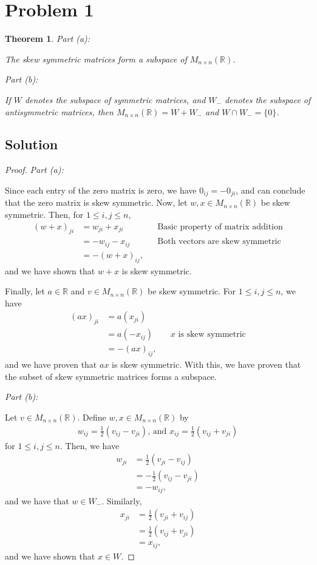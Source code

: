 \documentclass[10pt,a4paper]{article}
\author{Jeremiah Givens}
\makeatletter
\newtheorem{theorem}{Theorem}
\newcommand{\proofpart}[2]{%
  \par
  \addvspace{\medskipamount}%
  \noindent\emph{Part #1: #2}\par\nobreak
  \addvspace{\smallskipamount}%
  \@afterheading
}
\theoremstyle{definition}
\makeatother
\begin{document}
\section*{Problem 1}
\begin{theorem}
\proofpart{(a)}{} The skew symmetric matrices form a subspace of $M_{n \times n} (\mathbb{R})$.
\proofpart{(b)}{} If $W$ denotes the subspace of symmetric matrices, and $W_-$ denotes the subspace of antisymmetric matrices, then $M_{n \times n} (\mathbb{R}) = W + W_-$ and $W \cap W_- = \{0\}$.
\end{theorem}

\subsection*{Solution}
\begin{proof}
\proofpart{(a)}{} Since each entry of the zero matrix is zero, we have $0_{ij} = -0_{ji}$, and can conclude that the zero matrix is skew symmetric. Now, let $w, x \in M_{n \times n} (\mathbb{R})$ be skew symmetric. Then, for $1 \leq i,j \leq n$,
\begin{align*}
(w + x)_{ji} &= w_{ji} + x_{ji} &&\text{Basic property of matrix addition}\\
&= -w_{ij} - x_{ij} &&\text{Both vectors are skew symmetric}\\
&= -(w + x)_{ij},
\end{align*}
and we have shown that $w + x$ is skew symmetric.

Finally, let $a \in \mathbb{R}$ and $v \in M_{n \times n} (\mathbb{R})$ be skew symmetric. For $1 \leq i,j \leq n$, we have
\begin{align*}
(ax)_{ji} &= a (x_{ji})\\
&= a (-x_{ij}) &&x \text{ is skew symmetric}\\
&= -(ax)_{ij},
\end{align*}
and we have proven that $ax$ is skew symmetric. With this, we have proven that the subset of skew symmetric matrices forms a subspace.

\proofpart{(b)}{} Let $v \in M_{n \times n} (\mathbb{R})$. Define $w, x \in M_{n \times n} (\mathbb{R})$ by 
\begin{align*}
w_{ij} = \frac{1}{2}(v_{ij} - v_{ji}) \text{, and } x_{ij} = \frac{1}{2}(v_{ij} + v_{ji})
\end{align*}
for $1 \leq i,j \leq n$. Then, we have 
\begin{align*}
w_{ji} &= \frac{1}{2}(v_{ji} - v_{ij}) \\
&= - \frac{1}{2}(v_{ij} - v_{ji})\\
&= - w_{ij}\text{,}
\end{align*}
and we have that $w \in W_-$. Similarly,
\begin{align*}
x_{ji} &= \frac{1}{2}(v_{ji} + v_{ij})\\
&= \frac{1}{2}(v_{ij} + v_{ji})\\
&= x_{ij},
\end{align*}
and we have shown that $x \in W$. 


\end{proof}
\end{document}
